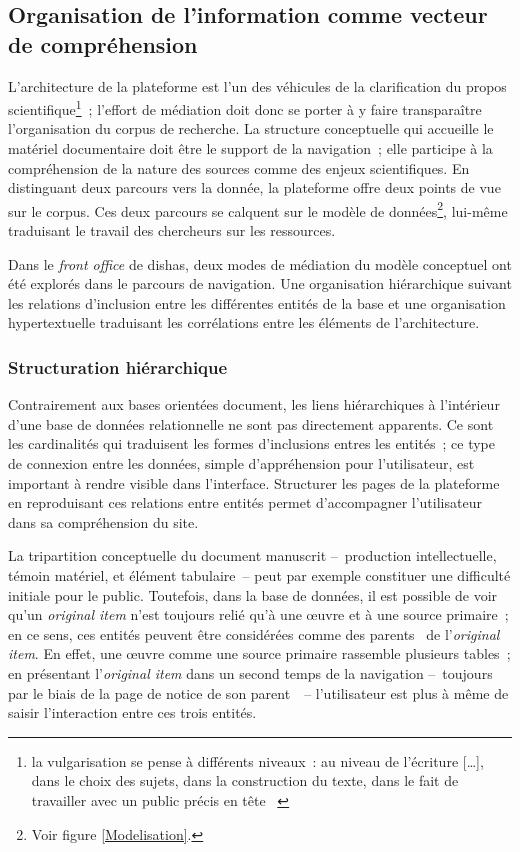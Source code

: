 \documentclass[a4paper,12pt,twoside]{book}
\newcommand{\eng}{\emph}
\newcommand{\p}{[\ldots]\xspace}
\newcommand{\oi}{\eng{original item}\xspace}
\newcommand{\bdd}{base de données\xspace}
\newcommand{\fo}{\eng{front office}\xspace}
\newcommand{\g}[1]{\og#1~\fg}
\newcommand{\dishas}{\gls{dishas}\xspace}
\begin{document}
		\subsection{Organisation de l'information comme vecteur de compréhension}
L'architecture de la plateforme est l'un des véhicules de la clarification du propos scientifique\footnote{\g{la vulgarisation se pense à différents niveaux~: au niveau de l’écriture \p, dans le choix des sujets, dans la construction du texte, dans le fait de travailler avec un public précis en tête} \cite{hegaratApprendreVulgariser}}~; l'effort de médiation doit donc se porter à y faire transparaître l'organisation du corpus de recherche. La structure conceptuelle qui accueille le matériel documentaire doit être le support de la navigation~; elle participe à la compréhension de la nature des sources comme des enjeux scientifiques. En distinguant deux parcours vers la donnée, la plateforme offre deux points de vue sur le corpus. Ces deux parcours se calquent sur le modèle de données\footnote{Voir figure \ref{Modelisation}.}, lui-même traduisant le travail des chercheurs sur les ressources.

Dans le \fo de \dishas, deux modes de médiation du modèle conceptuel ont été explorés dans le parcours de navigation. Une organisation hiérarchique suivant les relations d'inclusion entre les différentes entités de la base et une organisation hypertextuelle traduisant les corrélations entre les éléments de l'architecture.

			\subsubsection{Structuration hiérarchique}
Contrairement aux bases orientées document, les liens hiérarchiques à l'intérieur d'une \bdd relationnelle ne sont pas directement apparents. Ce sont les cardinalités qui traduisent les formes d'inclusions entres les entités~; ce type de connexion entre les données, simple d'appréhension pour l'utilisateur, est important à rendre visible dans l'interface. Structurer les pages de la plateforme en reproduisant ces relations entre entités permet d'accompagner l'utilisateur dans sa compréhension du site.

La tripartition conceptuelle du document manuscrit –~production intellectuelle, témoin matériel, et élément tabulaire~– peut par exemple constituer une difficulté initiale pour le public. Toutefois, dans la \bdd, il est possible de voir qu'un \oi n'est toujours relié qu'à une œuvre et à une source primaire~; en ce sens, ces entités peuvent être considérées comme des \g{parents} de l'\oi. En effet, une œuvre comme une source primaire rassemble plusieurs tables~; en présentant l'\oi dans un second temps de la navigation –~toujours par le biais de la page de notice de son \g{parent}~– l'utilisateur est plus à même de saisir l'interaction entre ces trois entités.
\end{document}
